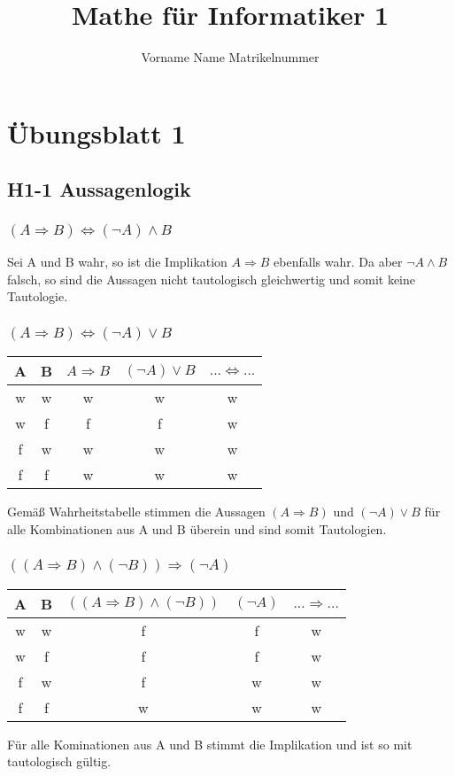 \documentclass{article}
\title{Mathe für Informatiker 1}
\author{Vorname Name Matrikelnummer}
\begin{document}
\maketitle

\section{Übungsblatt 1}
\subsection{H1-1 Aussagenlogik}
\subsubsection{\((A \Rightarrow B) \iff (\neg A) \land B  \)}

Sei A und B wahr, so ist die Implikation \(A \Rightarrow B\) ebenfalls wahr.
Da aber \(\neg A \land B  \) falsch, so sind die Aussagen nicht tautologisch gleichwertig und somit keine Tautologie.

\subsubsection{\((A \Rightarrow B) \iff (\neg A) \lor B  \)}
\begin{center}
\begin{tabular}{||c c | c c | c ||}
 A & B & \(A \Rightarrow B\) & \((\neg A) \lor B\) &\(... \iff ...\) \\
 \hline
 w & w & w & w & w \\
 w & f & f & f & w \\
 f & w & w & w & w \\
 f & f & w & w & w \\
\end{tabular}
\end{center}
Gemäß Wahrheitstabelle stimmen die Aussagen \((A \Rightarrow B) \) und \( (\neg A) \lor B  \)  für alle Kombinationen aus A und B überein und sind somit Tautologien.

\subsubsection{\(((A \Rightarrow B) \land (\neg B)) \Rightarrow  (\neg A)  \)}

\begin{center}
\begin{tabular}{||c c | c c| c ||}
 A & B & \(((A \Rightarrow B) \land (\neg B))\) & \((\neg A)\)  & \(... \Rightarrow ...\) \\
 \hline
 w & w & f & f & w \\
 w & f & f & f & w \\
 f & w & f & w & w \\
 f & f & w & w & w \\
\end{tabular}
\end{center}
Für alle Kominationen aus A und B stimmt die Implikation und ist so mit tautologisch gültig.
\end{document}
